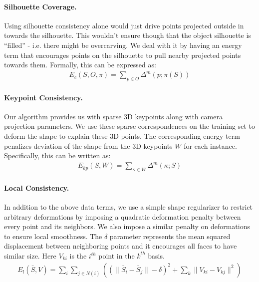 \paragraph{Silhouette Coverage.}
Using silhouette consistency alone would just drive points projected outside in towards the silhouette. This wouldn't ensure though that the object silhouette is ``filled'' - i.e. there might be overcarving. We deal with it by having an energy term that encourages points on the silhouette to pull nearby projected points towards them. Formally, this can be expressed as:
\begin{gather}
    \label{eq:sil_cov}E_{c}(S,O,\pi)=\underset{p\in O}{\sum}\Delta^m(p;\pi(S))
\end{gather}

\paragraph{Keypoint Consistency.} Our \nrsfm algorithm provides us with sparse 3D keypoints along with camera projection parameters. We use these sparse correspondences on the training set to deform the shape to explain these 3D points. The corresponding energy term penalizes deviation of the shape from the 3D keypoints $W$ for each instance. Specifically, this can be written as:
\begin{gather}
    \label{eq:kpgrad}E_{kp}(S,W)=\underset{\kappa\in W}{\sum}\Delta^m(\kappa;S)
\end{gather}

\paragraph{Local Consistency.} In addition to the above data terms, we use a simple shape regularizer to restrict arbitrary deformations by imposing a quadratic deformation penalty between every point and its neighbors. We also impose a similar penalty on deformations to ensure local smoothness. The $\delta$ parameter represents the mean squared displacement between neighboring points and it encourages all faces to have similar size. Here $V_{ki}$ is the $i^{th}$ point in the $k^{th}$ basis.
\begin{gather}
 \label{eq:local_con}E_{l}(\bar{S},V)=\underset{i}{\sum}\underset{j\in N(i)}{\sum}((\|\bar{S}_{i}-\bar{S}_{j}\| - \delta)^2 + \underset{k}{\sum}\|V_{ki}-V_{kj}\|^2)
 \end{gather}
 
